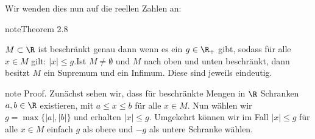 \documentclass[letterpaper,10pt,english]{jupyterBook}
\begin{document}
Wir wenden dies nun auf die reellen Zahlen an:
\label{grundlagen/zahlensysteme:theorem-28}
\begin{sphinxadmonition}{note}{Theorem 2.8}



\(M \subset \R\) ist beschränkt genau dann wenn es ein \(g \in \R_+\) gibt, sodass für alle \(x \in M\) gilt: \(|x|\leq g\).Ist \(M \neq \emptyset\) und \(M\) nach oben und unten beschränkt, dann besitzt \(M\) ein Supremum und ein Infimum. Diese sind jeweils eindeutig.
\end{sphinxadmonition}

\begin{sphinxadmonition}{note}
Proof.  Zunächst sehen wir, dass für beschränkte Mengen in \(\R\) Schranken \(a,b \in \R\) existieren, mit \(a \leq x  \leq b\) für alle \(x \in M\). Nun wählen wir \(g=\max\{|a|,|b|\}\) und erhalten \(|x|\leq g\). Umgekehrt können wir im Fall \(|x|\leq g\) für alle \(x \in M\) einfach \(g\) als obere und \(-g\) als untere Schranke wählen.


\end{sphinxadmonition}
\end{document}
